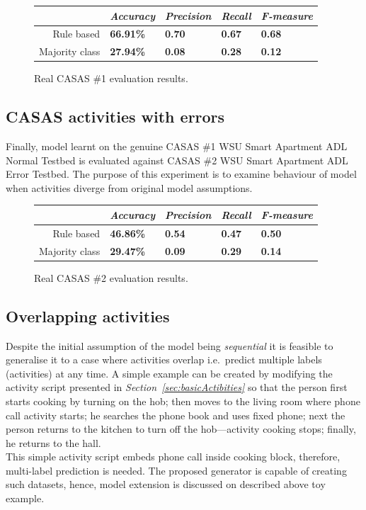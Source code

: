 \documentclass[10pt, a4paper, pdflatex, leqno, twoside, openright]{report}
\begin{document}
\begin{figure}[htb]
  \centering
  \begin{tabular}{ r | l l l l }
  & \emph{Accuracy} & \emph{Precision} & \emph{Recall} & \emph{F-measure}\\
\hline
Rule based & \textbf{66.91\%} & \textbf{0.70} & \textbf{0.67} & \textbf{0.68}\\
Majority class & \textbf{27.94\%} & \textbf{0.08} & \textbf{0.28} & \textbf{0.12}\\
  \end{tabular}
  \caption{Real CASAS \#1 evaluation results.\label{tab:realCASASstats}} %
\end{figure}

    \subsection{CASAS activities with errors}
Finally, model learnt on the genuine CASAS \#1 WSU Smart Apartment ADL Normal Testbed is evaluated against CASAS \#2 WSU Smart Apartment ADL Error Testbed. The purpose of this experiment is to examine behaviour of model when activities diverge from original model assumptions.

\begin{figure}[htb]
  \centering
  \begin{tabular}{ r | l l l l }
  & \emph{Accuracy} & \emph{Precision} & \emph{Recall} & \emph{F-measure}\\
\hline
Rule based & \textbf{46.86\%} & \textbf{0.54} & \textbf{0.47} & \textbf{0.50}\\
Majority class & \textbf{29.47\%} & \textbf{0.09} & \textbf{0.29} & \textbf{0.14}\\
  \end{tabular}
  \caption{Real CASAS \#2 evaluation results.\label{tab:errCASASstats}} %
\end{figure}

    \subsection{Overlapping activities\label{sec:singleML}}
Despite the initial assumption of the model being \emph{sequential} it is feasible to generalise it to a case where activities overlap i.e.\ predict multiple labels (activities) at any time. A simple example can be created by modifying the activity script presented in \emph{Section~\ref{sec:basicActibities}} so that the person first starts cooking by turning on the hob; then moves to the living room where phone call activity starts; he searches the phone book and uses fixed phone; next the person returns to the kitchen to turn off the hob---activity cooking stops; finally, he returns to the hall.\\
This simple activity script embeds phone call inside cooking block, therefore, multi-label prediction is needed. The proposed generator is capable of creating such datasets, hence, model extension is discussed on described above toy example.\\
\end{document}
